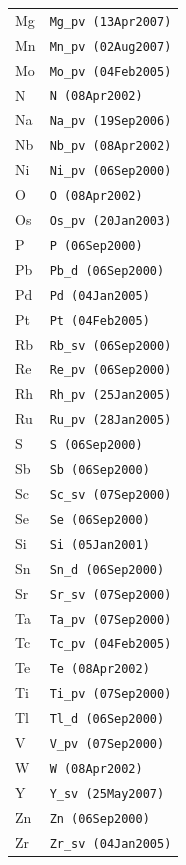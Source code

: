 \begin{longtable}{@{}l l@{}}
Mg & \texttt{Mg\_pv (13Apr2007)} \\
Mn & \texttt{Mn\_pv (02Aug2007)} \\
Mo & \texttt{Mo\_pv (04Feb2005)} \\
N & \texttt{N (08Apr2002)} \\
Na & \texttt{Na\_pv (19Sep2006)} \\
Nb & \texttt{Nb\_pv (08Apr2002)} \\
Ni & \texttt{Ni\_pv (06Sep2000)} \\
O & \texttt{O (08Apr2002)} \\
Os & \texttt{Os\_pv (20Jan2003)} \\
P & \texttt{P (06Sep2000)} \\
Pb & \texttt{Pb\_d (06Sep2000)} \\
Pd & \texttt{Pd (04Jan2005)} \\
Pt & \texttt{Pt (04Feb2005)} \\
Rb & \texttt{Rb\_sv (06Sep2000)} \\
Re & \texttt{Re\_pv (06Sep2000)} \\
Rh & \texttt{Rh\_pv (25Jan2005)} \\
Ru & \texttt{Ru\_pv (28Jan2005)} \\
S & \texttt{S (06Sep2000)} \\
Sb & \texttt{Sb (06Sep2000)} \\
Sc & \texttt{Sc\_sv (07Sep2000)} \\
Se & \texttt{Se (06Sep2000)} \\
Si & \texttt{Si (05Jan2001)} \\
Sn & \texttt{Sn\_d (06Sep2000)} \\
Sr & \texttt{Sr\_sv (07Sep2000)} \\
Ta & \texttt{Ta\_pv (07Sep2000)} \\
Tc & \texttt{Tc\_pv (04Feb2005)} \\
Te & \texttt{Te (08Apr2002)} \\
Ti & \texttt{Ti\_pv (07Sep2000)} \\
Tl & \texttt{Tl\_d (06Sep2000)} \\
V & \texttt{V\_pv (07Sep2000)} \\
W & \texttt{W (08Apr2002)} \\
Y & \texttt{Y\_sv (25May2007)} \\
Zn & \texttt{Zn (06Sep2000)} \\
Zr & \texttt{Zr\_sv (04Jan2005)} \\
\end{longtable}